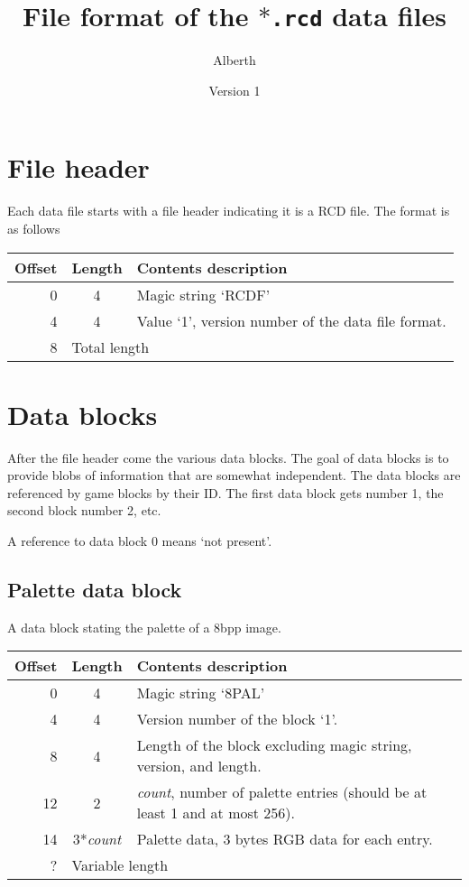 \documentclass{article}
\title{File format of the \texttt{$*$.rcd} data files}
\author{Alberth}
\date{Version 1}
\begin{document}
\maketitle

\section{File header}
Each data file starts with a file header indicating it is a RCD{} file.
The format is as follows

\begin{center}
\begin{tabular}{|r|c|l|} \hline
\textbf{Offset} & \textbf{Length} & \textbf{Contents description} \\ \hline
0 & 4 & Magic string `RCDF' \\
4 & 4 & Value `1', version number of the data file format. \\ \hline
8 & \multicolumn{2}{l|}{Total length} \\ \hline
\end{tabular}
\end{center}

\section{Data blocks}
After the file header come the various data blocks.
The goal of data blocks is to provide blobs of information that are somewhat independent.
The data blocks are referenced by game blocks by their ID. The first data block
gets number 1, the second block number 2, etc.

A reference to data block 0 means `not present'.

\subsection{Palette data block}
A data block stating the palette of a 8bpp image.

\begin{center}
\begin{tabular}{|r|c|l|} \hline
\textbf{Offset} & \textbf{Length} & \textbf{Contents description} \\ \hline
 0 & 4 & Magic string `8PAL' \\
 4 & 4 & Version number of the block `1'. \\
 8 & 4 & Length of the block excluding magic string, version, and length. \\
12 & 2 & \textit{count}, number of palette entries (should be at least 1 and at most 256). \\
14 & 3*\textit{count} & Palette data, 3 bytes RGB{} data for each entry. \\ \hline
 ? & \multicolumn{2}{l|}{Variable length} \\ \hline
\end{tabular}
\end{center}
\end{document}
